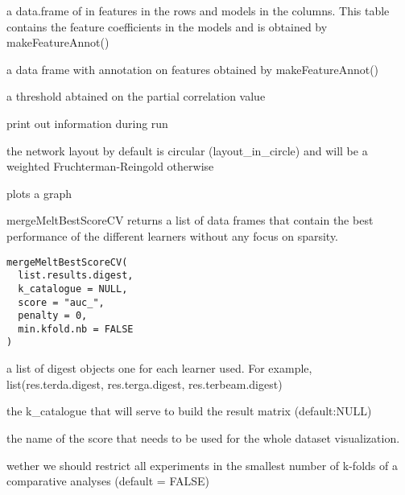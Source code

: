 \documentclass[a4paper]{book}
\begin{document}
%
\begin{Arguments}
\begin{ldescription}
\item[\code{pop.noz:}] a data.frame of in features in the rows and models in the columns. 
This table contains the feature coefficients in the models and is obtained by makeFeatureAnnot()

\item[\code{feature.annot:}] a data frame with annotation on features obtained by makeFeatureAnnot()

\item[\code{cor.th:}] a threshold abtained on the partial correlation value

\item[\code{verbose:}] print out information during run

\item[\code{layout:}] the network layout by default is circular (layout\_in\_circle) and will be a weighted Fruchterman-Reingold otherwise
\end{ldescription}
\end{Arguments}
%
\begin{Value}
plots a graph
\end{Value}
%
\begin{Description}
mergeMeltBestScoreCV returns a list of data frames that contain the best performance of the different learners without any focus on sparsity.
\end{Description}
%
\begin{Usage}
\begin{verbatim}
mergeMeltBestScoreCV(
  list.results.digest,
  k_catalogue = NULL,
  score = "auc_",
  penalty = 0,
  min.kfold.nb = FALSE
)
\end{verbatim}
\end{Usage}
%
\begin{Arguments}
\begin{ldescription}
\item[\code{list.results.digest:}] a list of digest objects one for each learner used. For example, list(res.terda.digest, res.terga.digest, res.terbeam.digest)

\item[\code{k\_catalogue:}] the k\_catalogue that will serve to build the result matrix (default:NULL)

\item[\code{score:}] the name of the score that needs to be used for the whole dataset visualization.

\item[\code{min.kfold.nb:}] wether we should restrict all experiments in the smallest number of k-folds of a comparative analyses (default = FALSE)
\end{ldescription}
\end{Arguments}
\end{document}
